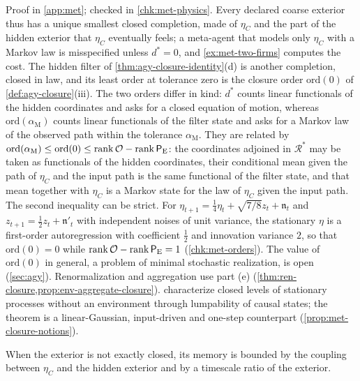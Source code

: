 \begin{theorem}
\begin{enumerate}
\end{enumerate}
\end{theorem}
Proof in \cref{app:met}; checked in \cref{chk:met-physics}. Every declared coarse exterior thus has a unique smallest closed completion, made of $\eta_C$ and the part of the hidden exterior that $\eta_C$ eventually feels; a meta-agent that models only $\eta_C$ with a Markov law is misspecified unless $d^\ast=0$, and \cref{ex:met-two-firms} computes the cost. The hidden filter of \cref{thm:agy-closure-identity}(d) is another completion, closed in law, and its least order at tolerance zero is the closure order $\mathrm{ord}(0)$ of \cref{def:agy-closure}(iii). The two orders differ in kind: $d^\ast$ counts linear functionals of the hidden coordinates and asks for a closed equation of motion, whereas $\mathrm{ord}(\alpha_{\mathrm M})$ counts linear functionals of the filter state and asks for a Markov law of the observed path within the tolerance $\alpha_{\mathrm M}$. They are related by $\mathrm{ord}(\alpha_{\mathrm M})\le\mathrm{ord}(0)\le\operatorname{rank}\mathcal O-\operatorname{rank}\mathsf P_{\mathrm E}$: the coordinates adjoined in $\mathcal R^\ast$ may be taken as functionals of the hidden coordinates, their conditional mean given the path of $\eta_C$ and the input path is the same functional of the filter state, and that mean together with $\eta_C$ is a Markov state for the law of $\eta_C$ given the input path. The second inequality can be strict. For $\eta_{t+1}=\frac14\eta_t+\sqrt{7/8}z_t+\mathfrak n_t$ and $z_{t+1}=\frac12z_t+\mathfrak n'_t$ with independent noises of unit variance, the stationary $\eta$ is a first-order autoregression with coefficient $\frac12$ and innovation variance $2$, so that $\mathrm{ord}(0)=0$ while $\operatorname{rank}\mathcal O-\operatorname{rank}\mathsf P_{\mathrm E}=1$ (\cref{chk:met-orders}). The value of $\mathrm{ord}(0)$ in general, a problem of minimal stochastic realization, is open (\cref{sec:agy}). Renormalization and aggregation use part (e) (\cref{thm:ren-closure,prop:env-aggregate-closure}).  characterize closed levels of stationary processes without an environment through lumpability of causal states; the theorem is a linear-Gaussian, input-driven and one-step counterpart (\cref{prop:met-closure-notions}).

When the exterior is not exactly closed, its memory is bounded by the coupling between $\eta_C$ and the hidden exterior and by a timescale ratio of the exterior.

